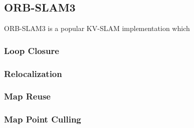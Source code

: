 \subsection{ORB-SLAM3}

ORB-SLAM3 is a popular KV-SLAM implementation which

\subsubsection{Loop Closure}
\subsubsection{Relocalization}
\subsubsection{Map Reuse}
\subsubsection{Map Point Culling}